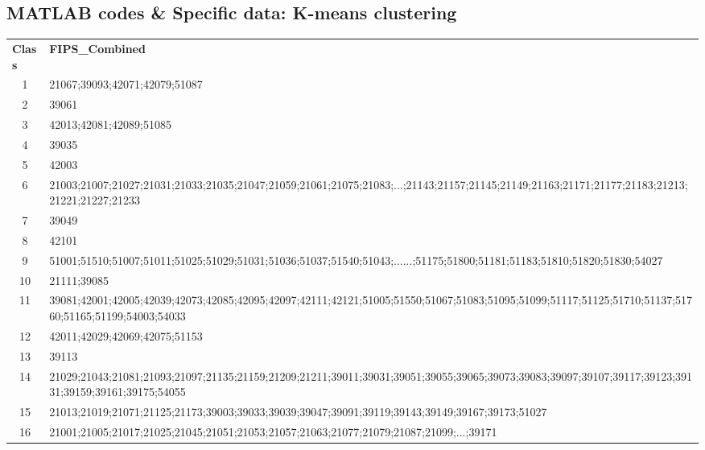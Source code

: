 \documentclass{mcmthesis}
\begin{document}
\begin{appendices}
\section{MATLAB codes \& Specific data: K-means clustering}
\begin{table}[htbp!]
  \raggedleft

    \begin{tabular}{clllllllllllllllllllllllllllllll}
    \multicolumn{1}{l}{\textbf{Class}} & \multicolumn{31}{l}{\textbf{FIPS\_Combined}} \\
    1     & \multicolumn{31}{l}{21067;39093;42071;42079;51087} \\
    2     & \multicolumn{31}{l}{39061} \\
    3     & \multicolumn{31}{l}{42013;42081;42089;51085} \\
    4     & \multicolumn{31}{l}{39035} \\
    5     & \multicolumn{31}{l}{42003} \\
    6     & \multicolumn{31}{l}{21003;21007;21027;21031;21033;21035;21047;21059;21061;21075;21083;...;21143;21157;21145;21149;21163;21171;21177;21183;21213;21221;21227;21233} \\
    7     & \multicolumn{31}{l}{39049} \\
    8     & \multicolumn{31}{l}{42101} \\
    9     & \multicolumn{31}{l}{51001;51510;51007;51011;51025;51029;51031;51036;51037;51540;51043;......;51175;51800;51181;51183;51810;51820;51830;54027} \\
    10    & \multicolumn{31}{l}{21111;39085} \\
    11    & \multicolumn{31}{l}{39081;42001;42005;42039;42073;42085;42095;42097;42111;42121;51005;51550;51067;51083;51095;51099;51117;51125;51710;51137;51760;51165;51199;54003;54033} \\
    12    & \multicolumn{31}{l}{42011;42029;42069;42075;51153} \\
    13    & \multicolumn{31}{l}{39113} \\
    14    & \multicolumn{31}{l}{21029;21043;21081;21093;21097;21135;21159;21209;21211;39011;39031;39051;39055;39065;39073;39083;39097;39107;39117;39123;39131;39159;39161;39175;54055} \\
    15    & \multicolumn{31}{l}{21013;21019;21071;21125;21173;39003;39033;39039;39047;39091;39119;39143;39149;39167;39173;51027} \\
    16    & \multicolumn{31}{l}{21001;21005;21017;21025;21045;21051;21053;21057;21063;21077;21079;21087;21099;...;39171} \\

\end{tabular}
\end{table}
\end{appendices}
\end{document}
